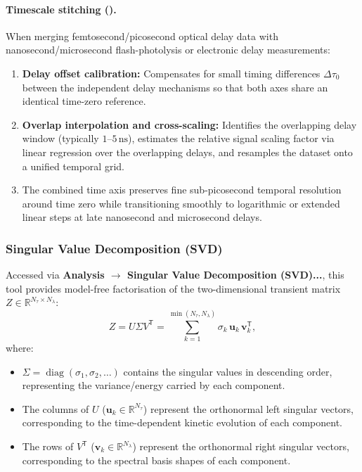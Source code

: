 \paragraph{Timescale stitching ().}
When merging femtosecond/picosecond optical delay data with nanosecond/microsecond flash-photolysis or electronic delay measurements:
\begin{enumerate}
  \item \textbf{Delay offset calibration:} Compensates for small timing differences $\Delta \tau_0$ between the independent delay mechanisms so that both axes share an identical time-zero reference.
  \item \textbf{Overlap interpolation and cross-scaling:} Identifies the overlapping delay window (typically $1$--$5\,\mathrm{ns}$), estimates the relative signal scaling factor via linear regression over the overlapping delays, and resamples the dataset onto a unified temporal grid.
  \item The combined time axis preserves fine sub-picosecond temporal resolution around time zero while transitioning smoothly to logarithmic or extended linear steps at late nanosecond and microsecond delays.
\end{enumerate}

\subsubsection{Singular Value Decomposition (SVD)}\label{sec:oneD:svd}

Accessed via \textbf{Analysis $\to$ Singular Value Decomposition (SVD)...}, this tool provides model-free factorisation of the two-dimensional transient matrix $Z \in \mathbb{R}^{N_\tau \times N_\lambda}$:
\begin{equation}
  Z = U \Sigma V^{\mathsf{T}} = \sum_{k=1}^{\min(N_\tau, N_\lambda)} \sigma_k\, \mathbf{u}_k\, \mathbf{v}_k^{\mathsf{T}},
\end{equation}
where:
\begin{itemize}
  \item $\Sigma = \operatorname{diag}(\sigma_1, \sigma_2, \dots)$ contains the singular values in descending order, representing the variance/energy carried by each component.
  \item The columns of $U$ ($\mathbf{u}_k \in \mathbb{R}^{N_\tau}$) represent the orthonormal left singular vectors, corresponding to the time-dependent kinetic evolution of each component.
  \item The rows of $V^{\mathsf{T}}$ ($\mathbf{v}_k \in \mathbb{R}^{N_\lambda}$) represent the orthonormal right singular vectors, corresponding to the spectral basis shapes of each component.
\end{itemize}

